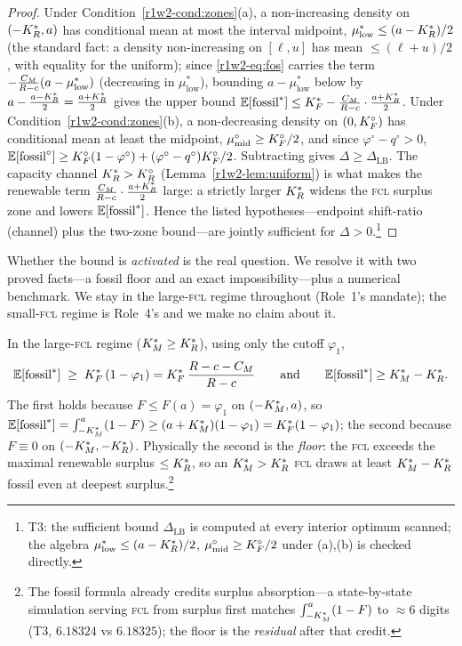 \begin{proof}
Under Condition~\ref{r1w2-cond:zones}(a), a non-increasing density on $(-K_R^{*},a)$ has
conditional mean at most the interval midpoint, $\mu^{*}_{\mathrm{low}}\le(a-K_R^{*})/2$
(the standard fact: a density non-increasing on $[\ell,u]$ has mean $\le(\ell+u)/2$,
with equality for the uniform);
since \eqref{r1w2-eq:fos} carries the term $-\frac{C_M}{R-c}(a-\mu^{*}_{\mathrm{low}})$
(decreasing in $\mu^{*}_{\mathrm{low}}$), bounding $a-\mu^{*}_{\mathrm{low}}$ below by
$a-\frac{a-K_R^{*}}{2}=\frac{a+K_R^{*}}{2}$ gives the upper bound
$\mathbb{E}[\text{fossil}^{*}]\le K_F^{*}-\frac{C_M}{R-c}\cdot\frac{a+K_R^{*}}{2}$.
Under Condition~\ref{r1w2-cond:zones}(b), a non-decreasing density on $(0,K_F^{\circ})$ has
conditional mean at least the midpoint, $\mu^{\circ}_{\mathrm{mid}}\ge K_F^{\circ}/2$,
and since $\varphi^{\circ}-q^{\circ}>0$,
$\mathbb{E}[\text{fossil}^{\circ}]\ge K_F^{\circ}(1-\varphi^{\circ})+(\varphi^{\circ}-q^{\circ})K_F^{\circ}/2$.
Subtracting gives $\Delta\ge\Delta_{\mathrm{LB}}$. The capacity channel
$K_R^{*}>K_R^{\circ}$ (Lemma~\ref{r1w2-lem:uniform}) is what makes the renewable term
$\frac{C_M}{R-c}\cdot\frac{a+K_R^{*}}{2}$ large: a strictly larger $K_R^{*}$ widens the
\textsc{fcl} surplus zone and lowers $\mathbb{E}[\text{fossil}^{*}]$. Hence the listed
hypotheses---endpoint shift-ratio (channel) plus the two-zone bound---are
jointly sufficient for $\Delta>0$.\footnote{T3: the sufficient bound
$\Delta_{\mathrm{LB}}$ is computed at every interior optimum scanned; the algebra
$\mu^{*}_{\mathrm{low}}\le(a-K_R^{*})/2$, $\mu^{\circ}_{\mathrm{mid}}\ge K_F^{\circ}/2$ under
(a),(b) is checked directly.}
\end{proof}

Whether the bound is \emph{activated} is the real question. We resolve it with two
proved facts---a fossil floor and an exact impossibility---plus a numerical
benchmark. We stay in the large-\textsc{fcl} regime throughout (Role~1's mandate);
the small-\textsc{fcl} regime is Role~4's and we make no claim about it.

\begin{lemma}\label{r1w2-lem:floor}
In the large-\textsc{fcl} regime ($K_M^{*}\ge K_R^{*}$), using only the cutoff $\varphi_1$,
\begin{equation}\label{r1w2-eq:floor}
  \mathbb{E}[\text{fossil}^{*}]\;\ge\;K_F^{*}\,(1-\varphi_1)=K_F^{*}\,\frac{R-c-C_M}{R-c}
  \qquad\text{and}\qquad \mathbb{E}[\text{fossil}^{*}]\ge K_M^{*}-K_R^{*} .
\end{equation}
The first holds because $F\le F(a)=\varphi_1$ on $(-K_M^{*},a)$, so
$\mathbb{E}[\text{fossil}^{*}]=\int_{-K_M^{*}}^{a}(1-F)\ge(a+K_M^{*})(1-\varphi_1)=K_F^{*}(1-\varphi_1)$;
the second because $F\equiv0$ on $(-K_M^{*},-K_R^{*})$. Physically the second is the
\emph{floor}: the \textsc{fcl} exceeds the maximal renewable surplus $\le K_R^{*}$, so
an $K_M^{*}>K_R^{*}$ \textsc{fcl} draws at least $K_M^{*}-K_R^{*}$ fossil even at deepest
surplus.\footnote{The fossil formula already credits surplus absorption---a
state-by-state simulation serving \textsc{fcl} from surplus first matches
$\int_{-K_M^{*}}^{a}(1-F)$ to $\approx6$ digits (T3, $6.18324$ vs $6.18325$); the floor
is the \emph{residual} after that credit.}
\end{lemma}

